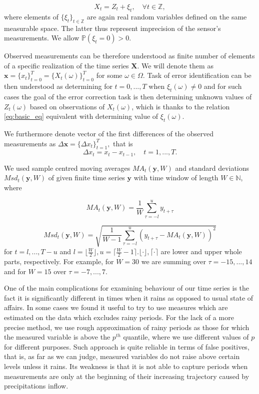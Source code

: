 \documentclass[12pt,a4paper]{article}
\begin{document}
\begin{equation}
    \label{eq:basic_eq}
    X_t = Z_t + \xi_t, \quad \forall t \in \mathbb{Z},
\end{equation}
where elements of $\lbrace \xi_t \rbrace_{t \in \mathbb{Z}} $ are again real random variables defined on the same measurable space. The latter thus represent imprecision of the sensor's measurements. We allow  $\mathbb{P}(\xi_t=0)>0.$

Observed measurements can be therefore understood as finite number of elements of a specific realization of the time series $\mathbf{X}$. We will denote them as $ \mathbf{x} = \lbrace x_t \rbrace_{t=0}^{T} =  \lbrace X_t(\omega) \rbrace_{t=0}^{T}$ for some $\omega \in \Omega$. Task of error identification can be then understood as determining  for $t=0,...,T$  when $\xi_t(\omega) \neq 0$ and for such cases the goal of the error correction task is then determining unknown values of $Z_t(\omega)$ based on observations of $X_t(\omega)$, which is thanks to the relation \ref{eq:basic_eq} equivalent with determining value of $\xi_t(\omega)$. 

We furthermore denote vector of the first differences of the observed measurements  as $ \Delta\mathbf{x}=  \lbrace\Delta x_t \rbrace_{t=1}^{T},$ that is 
$$ \Delta x_t = x_t - x_{t-1}, \quad t=1,...,T. $$

We used sample centred moving averages $MA_t(\mathbf{y}, W)$ and standard deviations $Msd_t(\mathbf{y},W)$ of given finite time series $\mathbf{y}$ with time window of length $W \in \mathbb{N}$, where 

$$ MA_t(\mathbf{y}, W) = \dfrac{1}{W}\sum_{\tau = -l}^{u}y_{t+\tau}  $$

$$ Msd_t(\mathbf{y}, W) = \sqrt{ \dfrac{1}{W-1}\sum_{\tau = -l}^{u}(y_{t+\tau} -MA_t(\mathbf{y},W) )^{2} }  $$
for $t=l,...,T-u$ and $ l = \lfloor \frac{W}{2} \rfloor, u = \lceil \frac{W}{2} -1\rceil. \lfloor  \cdot  \rfloor, \lceil  \cdot \rceil$ are lower and upper whole parts, respectively. For example, for $W=30$ we are summing over $\tau = -15,...,14$ and for $W=15$ over $\tau = -7,...,7.$


One of the main complications for examining behaviour of our time series is the fact it is significantly different in times when it rains as opposed to usual state of affairs. In some cases we found it useful to try to use measures which are estimated on the data which excludes rainy periods. For the lack of a more precise method, we use rough approximation of rainy periods as those for which the measured variable is above the $p^{th}$ quantile, where we use different values of $p$ for different purposes. Such approach is quite reliable in terms of false positives, that is, as far as we can judge, measured variables do not raise above certain levels unless it rains. Its weakness is that it is not able to capture periods when measurements are only at the beginning of their increasing trajectory caused by precipitations inflow. 
\end{document}
